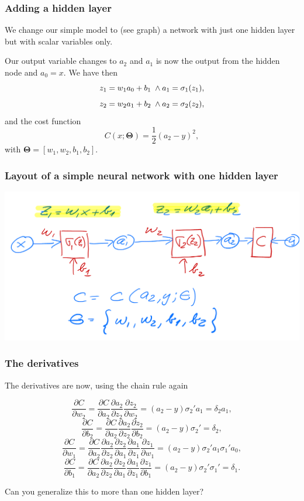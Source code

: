 \documentclass{beamer}
\begin{document}
\begin{frame}
\frametitle{Adding a hidden layer}

We change our simple model to (see graph)
a network with just one hidden layer but with scalar variables only.

Our output variable changes to $a_2$ and $a_1$ is now the output from the hidden node and $a_0=x$.
We have then
\[
z_1 = w_1a_0+b_1 \hspace{0.1cm} \wedge a_1 = \sigma_1(z_1),
\]
\[
z_2 = w_2a_1+b_2 \hspace{0.1cm} \wedge a_2 = \sigma_2(z_2),
\]
and the cost function
\[
C(x;\bm{\Theta})=\frac{1}{2}(a_2-y)^2,
\]
with $\bm{\Theta}=[w_1,w_2,b_1,b_2]$.
\end{frame}

\begin{frame}
\frametitle{Layout of a simple neural network with one hidden layer}

\vspace{6mm}

\centerline{\includegraphics[width=1.0\linewidth]{figures/simplenn2.png}}

\vspace{6mm}
\end{frame}

\begin{frame}
\frametitle{The derivatives}

The derivatives are now, using the chain rule again

\[
\frac{\partial C}{\partial w_2}=\frac{\partial C}{\partial a_2}\frac{\partial a_2}{\partial z_2}\frac{\partial z_2}{\partial w_2}=(a_2-y)\sigma_2'a_1=\delta_2a_1,
\]
\[
\frac{\partial C}{\partial b_2}=\frac{\partial C}{\partial a_2}\frac{\partial a_2}{\partial z_2}\frac{\partial z_2}{\partial b_2}=(a_2-y)\sigma_2'=\delta_2,
\]
\[
\frac{\partial C}{\partial w_1}=\frac{\partial C}{\partial a_2}\frac{\partial a_2}{\partial z_2}\frac{\partial z_2}{\partial a_1}\frac{\partial a_1}{\partial z_1}\frac{\partial z_1}{\partial w_1}=(a_2-y)\sigma_2'a_1\sigma_1'a_0,
\]
\[
\frac{\partial C}{\partial b_1}=\frac{\partial C}{\partial a_2}\frac{\partial a_2}{\partial z_2}\frac{\partial z_2}{\partial a_1}\frac{\partial a_1}{\partial z_1}\frac{\partial z_1}{\partial b_1}=(a_2-y)\sigma_2'\sigma_1'=\delta_1.
\]

Can you generalize this to more than one hidden layer?
\end{frame}
\end{document}
